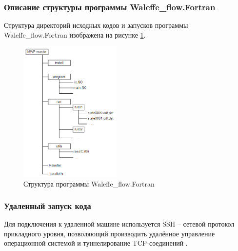 \def\notedate{2022.06.17}
\def\currentauthor{Амелькина А.-М. (РК6)}

\subsubsection{Описание структуры программы Waleffe_flow.Fortran}
Структура директорий исходных кодов и запусков программы Waleffe\_flow.Fortran изображена на рисунке \ref{structure}.
\begin{figure}[!ht]
	\centering
	\includegraphics[width=0.45\textwidth]{ResearchNotes/rndcmp_not_rcs_2022_06_17/MWF-иерархия.png}
	\caption{Структура программы Waleffe\_flow.Fortran}\label{structure}
\end{figure} 

\subsubsection{Удаленный запуск кода}

Для подключения к удаленной машине используется SSH -- сетевой протокол прикладного уровня, позволяющий производить удалённое управление операционной системой и туннелирование TCP-соединений  \cite{ssh}.

